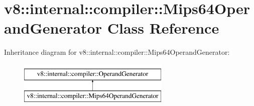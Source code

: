 \hypertarget{classv8_1_1internal_1_1compiler_1_1Mips64OperandGenerator}{}\section{v8\+:\+:internal\+:\+:compiler\+:\+:Mips64\+Operand\+Generator Class Reference}
\label{classv8_1_1internal_1_1compiler_1_1Mips64OperandGenerator}
Inheritance diagram for v8\+:\+:internal\+:\+:compiler\+:\+:Mips64\+Operand\+Generator\+:\begin{figure}[H]
\begin{center}
\leavevmode
\includegraphics[height=2.000000cm]{classv8_1_1internal_1_1compiler_1_1Mips64OperandGenerator}
\end{center}
\end{figure}
